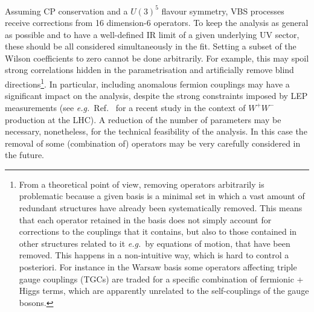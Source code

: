Assuming CP conservation and a $U(3)^5$ flavour symmetry, VBS processes receive corrections from 16 dimension-6 operators.
To keep the analysis as general as possible and to have a well-defined IR limit of a given underlying UV sector, these should be all considered simultaneously in the fit.
Setting a subset of the Wilson coefficients to zero cannot be done arbitrarily.
For example, this may spoil strong correlations hidden in the parametrisation and artificially remove blind 
directions\footnote{From a theoretical point of view, removing operators arbitrarily is problematic because a given basis is a minimal set in which a vast amount of redundant structures have already been systematically removed.
This means that each operator retained in the basis does not simply account for corrections to the couplings that it contains, but also to those contained in other structures related to it \emph{e.g.}\ by equations of motion, that have been removed.
This happens in a non-intuitive way, which is hard to control a posteriori.
For instance in the Warsaw basis some operators affecting triple gauge couplings (TGCs) are traded for a specific combination of fermionic + Higgs terms, which are apparently unrelated to the self-couplings of the gauge bosons.}.
In particular, including anomalous fermion couplings may have a significant impact on the analysis, despite the strong constraints imposed by LEP measurements (see \emph{e.g.}\ Ref.~\cite{Baglio:2017bfe} for a recent study in the context of $W^+ W^-$ production at the LHC).
A reduction of the number of parameters may be necessary, nonetheless, for the technical feasibility of the analysis. In this case the removal of some (combination of) operators may be  very carefully considered in the future.

